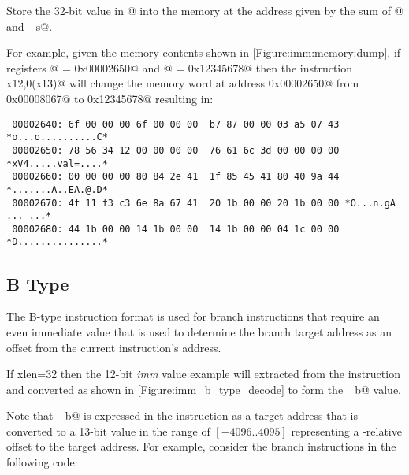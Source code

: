 \begin{itemize}
Store the 32-bit value in @ into the memory at the address given 
by the sum of @ and \verb@imm_s@.

For example, given the memory contents shown in \autoref{Figure:imm:memory:dump},
if registers @ = \verb@0x00002650@ and @ = \verb@0x12345678@
then the instruction \verb@sw x12,0(x13)@ will change the memory word at address 
\verb@0x00002650@ from \verb@0x00008067@ to \verb@0x12345678@ resulting in:

\begin{verbatim}
 00002640: 6f 00 00 00 6f 00 00 00  b7 87 00 00 03 a5 07 43 *o...o..........C*
 00002650: 78 56 34 12 00 00 00 00  76 61 6c 3d 00 00 00 00 *xV4.....val=....*
 00002660: 00 00 00 00 80 84 2e 41  1f 85 45 41 80 40 9a 44 *.......A..EA.@.D*
 00002670: 4f 11 f3 c3 6e 8a 67 41  20 1b 00 00 20 1b 00 00 *O...n.gA ... ...*
 00002680: 44 1b 00 00 14 1b 00 00  14 1b 00 00 04 1c 00 00 *D...............*
\end{verbatim}

\end{itemize}

\subsection{B Type}
\label{insnformat:btype}

The B-type instruction format is used for branch instructions that 
require an even immediate value that is used to determine the
branch target address as an offset from the current instruction's
address. 

If \Gls{xlen}=32 then the 12-bit {\em imm} value example will extracted from 
the instruction and converted as shown in \autoref{Figure:imm_b_type_decode}
to form the \verb@imm_b@ value.

\begin{figure}[ht]
\centering
\DrawInsnOpBTypeDecoding
{}
\label{Figure:imm_b_type_decode}
\label{imm.b:decode}
\end{figure}

Note that \verb@imm_b@ is expressed in the instruction as a target 
address that is converted to a 13-bit value in the range of 
$[-4096..4095]$ representing a \verb@pc@-relative offset to the
target address. For example, consider the branch instructions in
the following code:

